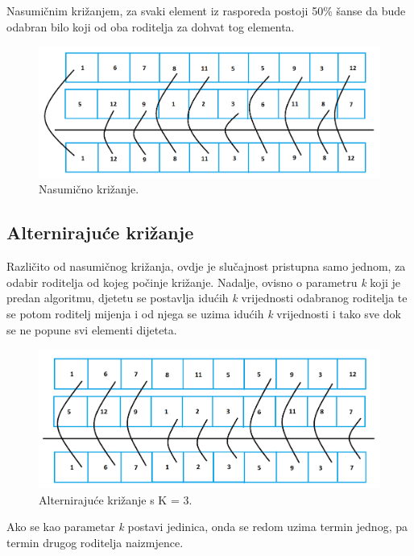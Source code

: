 \documentclass[times, utf8, zavrsni]{fer}
\begin{document}
Nasumičnim križanjem, za svaki element iz rasporeda postoji 50\% šanse da bude odabran bilo koji od oba roditelja za dohvat tog elementa.

\begin{figure}[htb]
\centering
\includegraphics[width=14cm]{images/rand_cross.png}
\caption{Nasumično križanje.}
\label{fig:rand_cross}
\end{figure}

\subsection{Alternirajuće križanje}

Različito od nasumičnog križanja, ovdje je slučajnost pristupna samo jednom, za odabir roditelja od kojeg počinje križanje. Nadalje, ovisno o parametru \emph{k} koji je predan algoritmu, djetetu se postavlja idućih \emph{k} vrijednosti odabranog roditelja te se potom roditelj mijenja i od njega se uzima idućih \emph{k} vrijednosti i tako sve dok se ne popune svi elementi dijeteta.

\begin{figure}[htb]
\centering
\includegraphics[width=14cm]{images/cross_alt.png}
\caption{Alternirajuće križanje s K = 3.}
\label{fig:cross_alt}
\end{figure}

Ako se kao parametar \emph{k} postavi jedinica, onda se redom uzima termin jednog, pa termin drugog roditelja naizmjence.
\end{document}
